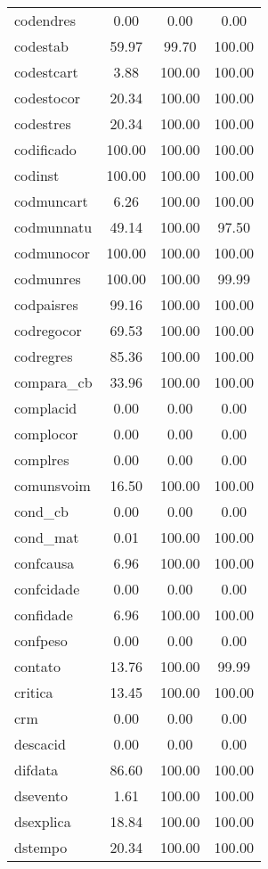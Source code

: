 \documentclass[
  12,
  table]{proadi}
\begin{document}
\begin{longtable}{lccc}
codendres & 0.00 & 0.00 & 0.00\\
\addlinespace
codestab & 59.97 & 99.70 & 100.00\\
codestcart & 3.88 & 100.00 & 100.00\\
codestocor & 20.34 & 100.00 & 100.00\\
codestres & 20.34 & 100.00 & 100.00\\
codificado & 100.00 & 100.00 & 100.00\\
\addlinespace
codinst & 100.00 & 100.00 & 100.00\\
codmuncart & 6.26 & 100.00 & 100.00\\
codmunnatu & 49.14 & 100.00 & 97.50\\
codmunocor & 100.00 & 100.00 & 100.00\\
codmunres & 100.00 & 100.00 & 99.99\\
\addlinespace
codpaisres & 99.16 & 100.00 & 100.00\\
codregocor & 69.53 & 100.00 & 100.00\\
codregres & 85.36 & 100.00 & 100.00\\
compara\_cb & 33.96 & 100.00 & 100.00\\
complacid & 0.00 & 0.00 & 0.00\\
\addlinespace
complocor & 0.00 & 0.00 & 0.00\\
complres & 0.00 & 0.00 & 0.00\\
comunsvoim & 16.50 & 100.00 & 100.00\\
cond\_cb & 0.00 & 0.00 & 0.00\\
cond\_mat & 0.01 & 100.00 & 100.00\\
\addlinespace
confcausa & 6.96 & 100.00 & 100.00\\
confcidade & 0.00 & 0.00 & 0.00\\
confidade & 6.96 & 100.00 & 100.00\\
confpeso & 0.00 & 0.00 & 0.00\\
contato & 13.76 & 100.00 & 99.99\\
\addlinespace
critica & 13.45 & 100.00 & 100.00\\
crm & 0.00 & 0.00 & 0.00\\
descacid & 0.00 & 0.00 & 0.00\\
difdata & 86.60 & 100.00 & 100.00\\
dsevento & 1.61 & 100.00 & 100.00\\
\addlinespace
dsexplica & 18.84 & 100.00 & 100.00\\
dstempo & 20.34 & 100.00 & 100.00\\

\end{longtable}
\end{document}
